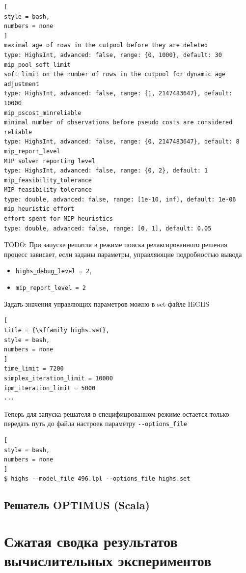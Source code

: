 \documentclass[%
	11pt,
	a4paper,
	utf8,
		]{article}
\begin{document}
\begin{lstlisting}[
style = bash,
numbers = none
]
maximal age of rows in the cutpool before they are deleted
type: HighsInt, advanced: false, range: {0, 1000}, default: 30
mip_pool_soft_limit
soft limit on the number of rows in the cutpool for dynamic age adjustment
type: HighsInt, advanced: false, range: {1, 2147483647}, default: 10000
mip_pscost_minreliable
minimal number of observations before pseudo costs are considered reliable
type: HighsInt, advanced: false, range: {0, 2147483647}, default: 8
mip_report_level
MIP solver reporting level
type: HighsInt, advanced: false, range: {0, 2}, default: 1
mip_feasibility_tolerance
MIP feasibility tolerance
type: double, advanced: false, range: [1e-10, inf], default: 1e-06
mip_heuristic_effort
effort spent for MIP heuristics
type: double, advanced: false, range: [0, 1], default: 0.05
\end{lstlisting}

{\noindent\color{red}TODO: При запуске решатля в режиме поиска релаксированного решения процесс зависает, если заданы параметры, управляющие подробностью вывода
\begin{itemize}
	\item \texttt{highs\_debug\_level = 2},
	
	\item  \texttt{mip\_report\_level = 2}
\end{itemize}
}

Задать значения управлющих параметров можно в set-файле HiGHS
\begin{lstlisting}[
title = {\sffamily highs.set},
style = bash,
numbers = none
]
time_limit = 7200
simplex_iteration_limit = 10000
ipm_iteration_limit = 5000
...
\end{lstlisting}

Теперь для запуска решателя в специфицрованном режиме остается только передать путь до файла настроек параметру \verb|--options_file|
\begin{lstlisting}[
style = bash,
numbers = none	
]
$ highs --model_file 496.lpl --options_file highs.set
\end{lstlisting}

\subsection{Решатель OPTIMUS (Scala)}


\section{Сжатая сводка результатов вычислительных экспериментов}
\end{document}
